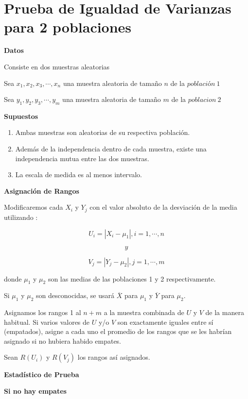 \documentclass[a4paper,oneside,openany]{book}
\begin{document}
\section{Prueba de Igualdad de Varianzas para 2
poblaciones}\label{prueba-de-igualdad-de-varianzas-para-2-poblaciones}

\textbf{Datos}

Consiste en dos muestras aleatorias

Sea \(x_{1},x_{2},x_{3},\cdots,x_{n}\) una muestra aleatoria de tamaño
\(n\) de la \(población\ 1\)

Sea \(y_{1},y_{2},y_{3},\cdots,y_{m}\) una muestra aleatoria de tamaño
\(m\) de la \(poblacion\ 2\)

\textbf{Supuestos}

\begin{enumerate}
\def\labelenumi{\arabic{enumi})}
\item
  Ambas muestras son aleatorias de su respectiva población.
\item
  Además de la independencia dentro de cada muestra, existe una
  independencia mutua entre las dos muestras.
\item
  La escala de medida es al menos intervalo.
\end{enumerate}

\textbf{Asignación de Rangos}

Modificaremos cada \(X_{i}\) y \(Y_{j}\) con el valor absoluto de la
desviación de la media utilizando :

\[U_{i} = |X_{i}-\mu_{1}|  , i=1,\cdots,n\]

\[y\]

\[V_{j} = |Y_{j}-\mu_{2}|  , j=1,\cdots,m\]

donde \(\mu_{1}\) y \(\mu_{2}\) son las medias de las poblaciones 1 y 2
respectivamente.

Si \(\mu_{1}\) y \(\mu_{2}\) son desconocidas, se usará \(\overline{X}\)
para \(\mu_{1}\) y \(\overline{Y}\) para \(\mu_{2}\).

Asignamos los rangos 1 al \(n + m\) a la muestra combinada de \(U\) y
\(V\) de la manera habitual. Si varios valores de \(U\) y/o \(V\) son
exactamente iguales entre sí (empatados), asigne a cada uno el promedio
de los rangos que se les habrían asignado si no hubiera habido empates.

Sean \(R(U_{i})\) y \(R(V_{j})\) los rangos así asignados.

\textbf{Estadístico de Prueba}

\textbf{Si no hay empates}
\end{document}
